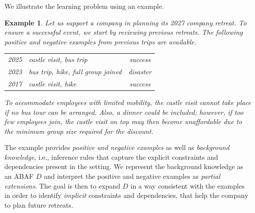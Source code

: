 \documentclass[letterpaper]{article} %
\newcommand{\contrary}[1]{c(#1)}
\newtheorem{example}{Example}[section]
\begin{document}
We illustrate the learning problem using an example. 
%
\begin{example}\label{ex:intro}
Let us support a company in planning its 2027 company retreat. To ensure a successful event, we start by reviewing previous retreats. The following \emph{positive and negative examples} from previous trips are available.
\begin{center}
    \begin{tabular}{c l c}
    \toprule
       2025  & castle visit, bus trip & success \\
       2023  & bus trip, hike, full group joined & disaster \\
       2017  & castle visit, hike & success \\
         \bottomrule
    \end{tabular}
\end{center}
To accommodate employees with limited mobility, the castle visit cannot take place if no bus tour can be arranged.
Also, a dinner could be included; however, if too few employees join, the castle visit on top may then become unaffordable due to the minimum group size required for the discount.
%
%
%   
%
%
%
%
%
%
\end{example}
The example provides \emph{positive and negative examples} as well as \emph{background knowledge}, i.e., inference rules that capture the explicit constraints and dependencies present in the setting. We represent the background knowledge as an ABAF $D$ and interpret the positive and negative examples as \emph{partial extensions}. The goal is then to expand $D$ in a way consistent with the examples in order to identify \emph{implicit} constraints and dependencies, that help the company to plan future retreats. 
\end{document}
